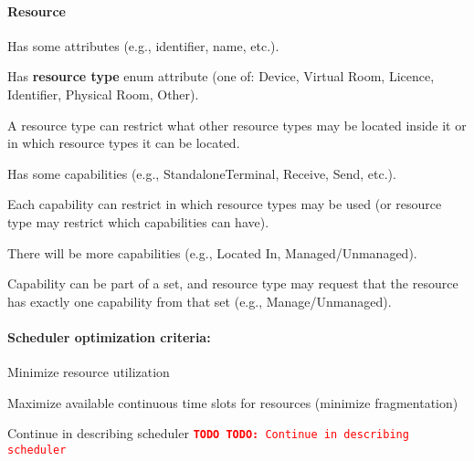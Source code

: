 \documentclass[a4paper]{report}
\newcommand{\TODO}[1]{%
\def\empty{}%
\def\prvniparametr{#1}%
\ifx\prvniparametr\empty%
\begingroup\tt\textcolor{red}{\noindent\textbf{TODO}}\endgroup
\else%
\begingroup\tt\textcolor{red}{\noindent\textbf{TODO:}\ #1}\endgroup
\fi%
}
\begin{document}
\paragraph{Resource}
\begin{compactitem}
\item Has some attributes (e.g., identifier, name, etc.).
\item Has \textbf{resource type} enum attribute (one of: Device, Virtual Room, Licence, Identifier, Physical Room, Other).
\item A resource type can restrict what other resource types may be located inside it or in which resource types it can be located.
\item Has some capabilities (e.g., StandaloneTerminal, Receive, Send, etc.).
\item Each capability can restrict in which resource types may be used (or resource type may restrict which capabilities can have).
\item There will be more capabilities (e.g., Located In, Managed/Unmanaged).
\item Capability can be part of a set, and resource type may request that the resource has exactly one capability from that set (e.g., Manage/Unmanaged). 
\end{compactitem}

\paragraph{Scheduler optimization criteria:}
\begin{compactitem}
\item Minimize resource utilization
\item Maximize available continuous time slots for resources (minimize fragmentation)
\end{compactitem}

\TODO{Continue in describing scheduler}
\end{document}
